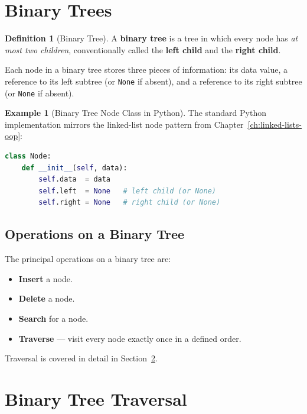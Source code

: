 \documentclass[11pt, a4paper, notitlepage]{report}
\theoremstyle{definition}
\newtheorem{definition}[theorem]{Definition}
\theoremstyle{remark}
\theoremstyle{definition}
\newtheorem{example}[theorem]{Example}
\begin{document}
\section{Binary Trees}
\label{sec:binary-trees}

\begin{definition}[Binary Tree]
\label{def:binary-tree}
A \textbf{binary tree} is a tree in which every node has \emph{at most two
children}, conventionally called the \textbf{left child} and the \textbf{right
child}.
\end{definition}

Each node in a binary tree stores three pieces of information: its data value,
a reference to its left subtree (or \texttt{None} if absent), and a reference
to its right subtree (or \texttt{None} if absent).

\begin{example}[Binary Tree Node Class in Python]
\label{ex:btnode-class}
The standard Python implementation mirrors the linked-list node pattern from
Chapter~\ref{ch:linked-lists-oop}:

\begin{lstlisting}[language=Python]
class Node:
    def __init__(self, data):
        self.data  = data
        self.left  = None   # left child (or None)
        self.right = None   # right child (or None)
\end{lstlisting}
\end{example}

\subsection{Operations on a Binary Tree}
\label{subsec:bt-operations}

The principal operations on a binary tree are:
\begin{itemize}
  \item \textbf{Insert} a node.
  \item \textbf{Delete} a node.
  \item \textbf{Search} for a node.
  \item \textbf{Traverse} --- visit every node exactly once in a defined order.
\end{itemize}

Traversal is covered in detail in Section~\ref{sec:bt-traversal}.

\section{Binary Tree Traversal}
\label{sec:bt-traversal}
\end{document}
